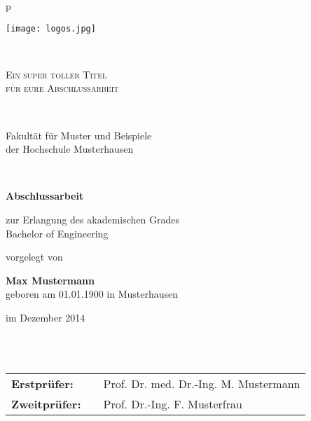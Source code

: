 \begin{center}
\begin{tabular}{p{\textwidth}}


\begin{center}
\texttt{[image: logos.jpg]}
\end{center}


\\

\begin{center}
\LARGE{\textsc{
Ein super toller Titel \\
für eure Abschlussarbeit\\
}}
\end{center}

\\


\begin{center}
\large{Fakultät für Muster und Beispiele \\
der Hochschule Musterhausen \\}
\end{center}

\\

\begin{center}
\textbf{\Large{Abschlussarbeit}}
\end{center}


\begin{center}
zur Erlangung des akademischen Grades\\
Bachelor of Engineering
\end{center}


\begin{center}
vorgelegt von
\end{center}

\begin{center}
\large{\textbf{Max Mustermann}} \\
\small{geboren am 01.01.1900 in Musterhausen}
\end{center}

\begin{center}
\large{im Dezember 2014}
\end{center}

\\

\\

\begin{center}
\begin{tabular}{lll}
\textbf{Erstprüfer:} & & Prof. Dr. med. Dr.-Ing. M. Mustermann\\
\textbf{Zweitprüfer:} & &Prof. Dr.-Ing. F. Musterfrau\\
\end{tabular}
\end{center}

\end{tabular}
\end{center}